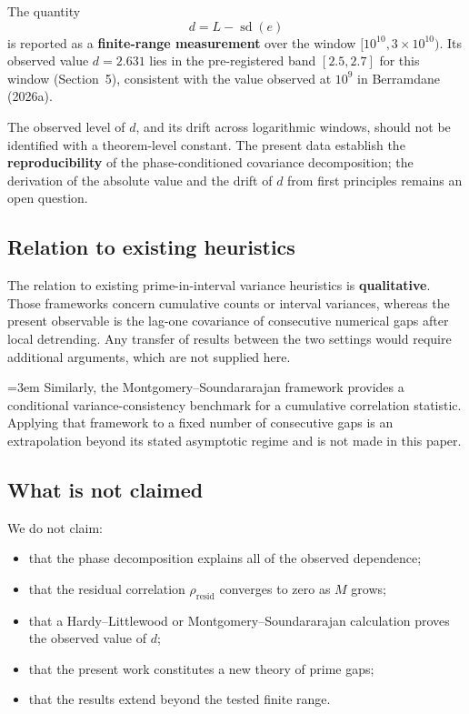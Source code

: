 The quantity
\[
d = L - \operatorname{sd}(e)
\]
is reported as a \textbf{finite-range measurement} over the window $[10^{10}, 3\times 10^{10})$. Its observed value $d = 2.631$ lies in the pre-registered band $[2.5, 2.7]$ for this window (Section~5), consistent with the value observed at $10^9$ in Berramdane (2026a).

The observed level of $d$, and its drift across logarithmic windows, should not be identified with a theorem-level constant. The present data establish the \textbf{reproducibility} of the phase-conditioned covariance decomposition; the derivation of the absolute value and the drift of $d$ from first principles remains an open question.

\subsection{Relation to existing heuristics}

The relation to existing prime-in-interval variance heuristics is \textbf{qualitative}. Those frameworks concern cumulative counts or interval variances, whereas the present observable is the lag-one covariance of consecutive numerical gaps after local detrending. Any transfer of results between the two settings would require additional arguments, which are not supplied here.

\sloppy
\emergencystretch=3em
Similarly, the Montgomery--Soundararajan framework provides a conditional variance-consistency benchmark for a cumulative correlation statistic. Applying that framework to a fixed number of consecutive gaps is an extrapolation beyond its stated asymptotic regime and is not made in this paper.

\fussy

\subsection{What is not claimed}

We do not claim:

\begin{itemize}
\item that the phase decomposition explains all of the observed dependence;
\item that the residual correlation $\rho_{\text{resid}}$ converges to zero as $M$ grows;
\item that a Hardy--Littlewood or Montgomery--Soundararajan calculation proves the observed value of $d$;
\item that the present work constitutes a new theory of prime gaps;
\item that the results extend beyond the tested finite range.
\end{itemize}

